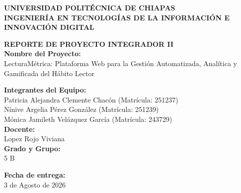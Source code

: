 \documentclass[12pt, atypical, journal]{article}
\begin{document}
\begin{titlepage}
   \begin{center}
       \vspace*{1cm}
      
       {\Large\bfseries UNIVERSIDAD POLITÉCNICA DE CHIAPAS} \\[0.5cm]
       {\large\bfseries INGENIERÍA EN TECNOLOGÍAS DE LA INFORMACIÓN E INNOVACIÓN DIGITAL} \\[1.5cm]
      
       \vfill
      
       {\Large\bfseries REPORTE DE PROYECTO INTEGRADOR II} \\[1cm]
      
       \textbf{Nombre del Proyecto:} \\
       {\large LecturaMétrica: Plataforma Web para la Gestión Automatizada, Analítica y Gamificada del Hábito Lector} \\[1.5cm]
      
       \vfill
      
       \textbf{Integrantes del Equipo:} \\[0.3cm]
       {\large Patricia Alejandra Clemente Chacón (Matrícula: 251237)} \\
       {\large Nínive Argelia Pérez González (Matrícula: 251239)} \\
       {\large Mónica Jamileth Velázquez García (Matrícula: 243729)} \\[1.5cm]
      
       \textbf{Docente:} \\
       {\large Lopez Rojo Viviana} \\[1.5cm]
       
       \textbf{Grado y Grupo:} \\
       {\large 5 B} \\[1.5cm]
      
       \vfill
      
       \textbf{Fecha de entrega:} \\
       {\large 3 de Agosto de 2026}
      
       \vspace*{1cm}
   \end{center}
\end{titlepage}

\newpage
\end{document}
